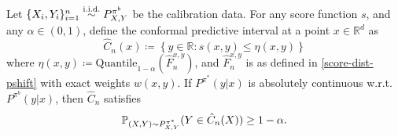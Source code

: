 \begin{proposition}\label{coverage_theorem}
Let $\{X_i, Y_i\}_{i =1}^n \overset{\textup{i.i.d.}}{\sim}P^{\pi^b}_{X,Y}$ be the calibration data. For any score function $s$, and any $\alpha \in (0,1)$, define the conformal predictive interval at a point $x\in \mathbb{R}^d$ as 
$$\hat{C}_n(x) \coloneqq \left\{y \in \mathbb{R}: s(x, y) \leq \eta(x,y) \right\}$$
where $\eta(x, y) \coloneqq \text{Quantile}_{1-\alpha}( \hat{F}_{n}^{x, y})$, and $\hat{F}_{n}^{x, y}$ is as defined in \eqref{score-dist-pshift} with exact weights $w(x,y)$.
If $P^{\pi^*}(y| x)$ is absolutely continuous w.r.t. $P^{\pi^b}(y| x)$,
then $\hat{C}_{n}$ satisfies
$$\mathbb{P}_{(X,Y)\sim P^{\pi^*}_{X,Y}}(Y \in \hat{C}_{n}(X)) \geq 1-\alpha \nonumber.$$
\end{proposition}
